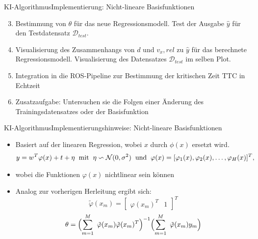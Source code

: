 \documentclass[169, handout	]{THIbeamer} %
\begin{document}
	\begin{frame}{KI-Algorithmus}{Implementierung: Nicht-lineare Basisfunktionen}
		\begin{enumerate}
			\setcounter{enumi}{2}	
			\item Bestimmung von $\theta$ für das neue Regressionsmodell. Test der Ausgabe $\hat{y}$ für den Testdatensatz $\mathcal{D}_{test}$.
			\item Visualisierung des Zusammenhangs von $d$ und $v_x,rel$ zu $\hat{y}$ für das berechnete Regressionsmodell. Visualisierung des Datensatzes $\mathcal{D}_{test}$ im selben Plot.
			\item Integration in die ROS-Pipeline zur Bestimmung der kritischen Zeit TTC in Echtzeit
			\item Zusatzaufgabe: Untersuchen sie die Folgen einer Änderung des Trainingsdatensatzes oder der Basisfunktion
		\end{enumerate}
	\end{frame}
	\begin{frame}{KI-Algorithmus}{Implementierungshinweise: Nicht-lineare Basisfunktionen}
		\begin{itemize}
			\item Basiert auf der linearen Regression, wobei $x$ durch $\phi (x)$ ersetzt wird.
			\begin{equation}
				y = w^T \varphi (x) + t + \eta
				\hspace{0.2 cm}
				\text{mit}
				\hspace{0.2 cm}
				\eta \backsim \mathcal{N}(0, \sigma^2)
				\hspace{0.2 cm}
				\text{und} \hspace{0.2 cm} 			
				\varphi (x) = [ \varphi_1 (x), \varphi_2 (x), \dots, \varphi_H (x)]^T \text{,}
			\end{equation}
			\item[] wobei die Funktionen $\varphi (x)$ nichtlinear sein können
			\item Analog zur vorherigen Herleitung ergibt sich:
			\begin{equation}
				\tilde{\varphi} (x_m)= 
				\begin{bmatrix}
					\varphi (x_m)^T & 1
				\end{bmatrix}^T
			\end{equation}
			\begin{equation}
				\theta = \Bigl( \sum_{m=1}^M\ \tilde{\varphi} (x_m) \tilde{\varphi} (x_m)^T \Bigr)^{-1} \Bigl( \sum_{m=1}^M\ \tilde{\varphi} (x_m) y_m \Bigr) 
			\end{equation}
		\end{itemize}
	\end{frame}
\end{document}
